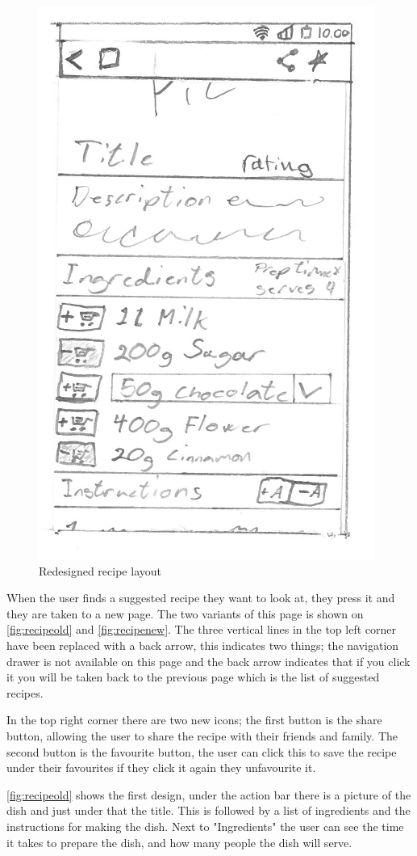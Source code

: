 \begin{figure}[H]
\begin{minipage}[b]{0.5\columnwidth}
\centering
\includegraphics[width=0.7\columnwidth]{img/prototypes/recipe_new.pdf}
\caption{Redesigned recipe layout\label{fig:recipenew}}
\end{minipage}
\end{figure}

When the user finds a suggested recipe they want to look at, they press it and they are taken to a new page. The two variants of this page is shown on \autoref{fig:recipeold} and \autoref{fig:recipenew}. The three vertical lines in the top left corner have been replaced with a back arrow, this indicates two things; the navigation drawer is not available on this page and the back arrow indicates that if you click it you will be taken back to the previous page which is the list of suggested recipes.

In the top right corner there are two new icons; the first button is the share button, allowing the user to share the recipe with their friends and family. The second button is the favourite button, the user can click this to save the recipe under their favourites if they click it again they unfavourite it.

\autoref{fig:recipeold} shows the first design, under the action bar there is a picture of the dish and just under that the title. This is followed by a list of ingredients and the instructions for making the dish. Next to "Ingredients" the user can see the time it takes to prepare the dish, and how many people the dish will serve.

